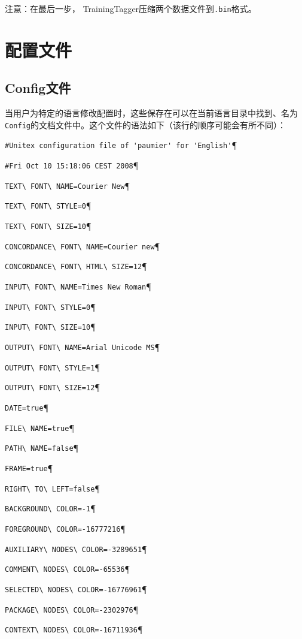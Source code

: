 \bigskip
\noindent
注意：在最后一步， TrainingTagger压缩两个数据文件到\verb+.bin+格式。


\section{配置文件}
\subsection{ Config文件}
当用户为特定的语言修改配置时，这些保存在可以在当前语言目录中找到、名为\verb+Config+的文档文件中。这个文件的语法如下（该行的顺序可能会有所不同）：




\bigskip
\verb$#Unitex configuration file of 'paumier' for 'English'$\P

\verb$#Fri Oct 10 15:18:06 CEST 2008$\P

\verb$TEXT\ FONT\ NAME=Courier New$\P

\verb$TEXT\ FONT\ STYLE=0$\P

\verb$TEXT\ FONT\ SIZE=10$\P

\verb$CONCORDANCE\ FONT\ NAME=Courier new$\P

\verb$CONCORDANCE\ FONT\ HTML\ SIZE=12$\P

\verb$INPUT\ FONT\ NAME=Times New Roman$\P

\verb$INPUT\ FONT\ STYLE=0$\P

\verb$INPUT\ FONT\ SIZE=10$\P

\verb$OUTPUT\ FONT\ NAME=Arial Unicode MS$\P

\verb$OUTPUT\ FONT\ STYLE=1$\P

\verb$OUTPUT\ FONT\ SIZE=12$\P

\verb$DATE=true$\P

\verb$FILE\ NAME=true$\P

\verb$PATH\ NAME=false$\P

\verb$FRAME=true$\P

\verb$RIGHT\ TO\ LEFT=false$\P

\verb$BACKGROUND\ COLOR=-1$\P

\verb$FOREGROUND\ COLOR=-16777216$\P

\verb$AUXILIARY\ NODES\ COLOR=-3289651$\P

\verb$COMMENT\ NODES\ COLOR=-65536$\P

\verb$SELECTED\ NODES\ COLOR=-16776961$\P

\verb$PACKAGE\ NODES\ COLOR=-2302976$\P

\verb$CONTEXT\ NODES\ COLOR=-16711936$\P

